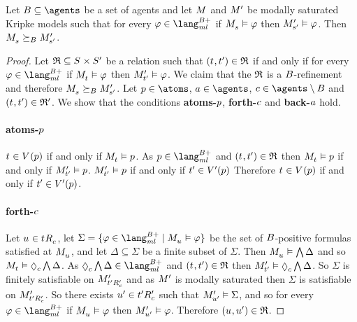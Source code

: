 \begin{proposition}
Let $\agentsB \subseteq \agents$ be a set of agents and let $\kModel$ and ${M^{\prime}_{}}$ be modally saturated Kripke models such that for every $\phi \in \langMlPlusBs$ if $\kPModel{\kStateS} \entails \phi$ then ${M^{\prime}_{{s}^{\prime}}} \vDash \varphi$.
Then $\kPModel{\kStateS} \simulatesBs \kPModelP{\kStateSP}$.
\end{proposition}

\begin{proof}
Let $\refinement \subseteq \kStates \times \kStatesP$ be a relation such that $(\kStateT, \kStateTP) \in \refinement$ if and only if for every $\phi \in \langMlPlusBs$ if $\kPModel{\kStateT} \entails \phi$ then ${M^{\prime}_{{t}^{\prime}}} \vDash \varphi$.
We claim that the $\mathfrak{R}$ is a $B$-refinement and therefore $\kPModel{\kStateS} \simulatesBs \kPModelP{\kStateSP}$.
Let $\atomP \in \atoms$, $\agentA \in \agents$, $\agentC \in \agents \setminus \agentsB$ and $(\kStateT, \kStateTP) \in \refinement'$.
We show that the conditions {\bf atoms-$p$}, {\bf forth-$c$} and {\bf back-$a$} hold.

\paragraph{atoms-$p$}
$\kStateT \in \kValuation(\atomP)$ if and only if $\kPModel{\kStateT} \entails \atomP$.
As $\atomP \in \langMlPlusBs$ and $(\kStateT, \kStateTP) \in \refinement$ then $\kPModel{\kStateT} \entails \atomP$ if and only if ${M^{\prime}_{{t}^{\prime}}} \vDash p$.
${M^{\prime}_{{t}^{\prime}}} \vDash p$ if and only if ${t}^{\prime} \in {V^{\prime}}(p)$
Therefore $\kStateT \in \kValuation(\atomP)$ if and only if ${t}^{\prime} \in {V^{\prime}}(p)$.

\paragraph{forth-$c$}
Let $\kStateU \in \kSuccessorsC{\kStateT}$, let $\Sigma = \{\phi \in \langMlPlusBs \mid \kPModel{\kStateU} \entails \phi\}$ be the set of $B$-positive formulas satisfied at $\kPModel{\kStateU}$, and let $\Delta \subseteq \Sigma$ be a finite subset of $\Sigma$.
Then $\kPModel{\kStateU} \entails \bigwedge \Delta$ and so $\kPModel{\kStateT} \entails \possibleC \bigwedge \Delta$.
As $\possibleC \bigwedge \Delta \in \langMlPlusBs$ and $(\kStateT, \kStateTP) \in \refinement$ then $\kPModelP{\kStateTP} \entails \possibleC \bigwedge \Delta$.
So $\Sigma$ is finitely satisfiable on ${M^{\prime}_{{{t}^{\prime}} {R^{\prime}_{c}}}}$ and as ${M^{\prime}_{}}$ is modally saturated then $\Sigma$ is satisfiable on ${M^{\prime}_{{{t}^{\prime}} {R^{\prime}_{c}}}}$.
So there exists ${u}^{\prime} \in {{t}^{\prime}} {R^{\prime}_{c}}$ such that ${M^{\prime}_{{u}^{\prime}}} \vDash \Sigma$, and so for every $\phi \in \langMlPlusBs$ if $\kPModel{\kStateU} \entails \phi$ then ${M^{\prime}_{{u}^{\prime}}} \vDash \varphi$.
Therefore $(\kStateU, \kStateUP) \in \refinement$.


\end{proof}
